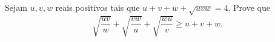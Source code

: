 \documentclass[10pt,a4paper]{article}
\begin{document}
	\begin{prob}%
		Sejam $u, v, w$ reais positivos tais que $u + v + w + \sqrt{uvw} = 4$. Prove que  \[
			\sqrt{\frac{uv}{w}} + \sqrt{\frac{vw}{u}} + \sqrt{\frac{wu}{v}} \ge u + v + w.
		\]
	\end{prob}
\end{document}
